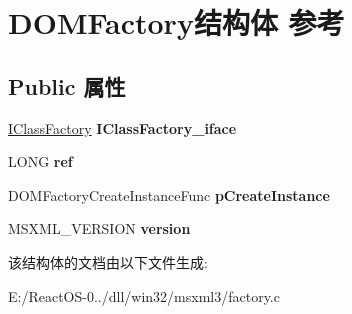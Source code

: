 \hypertarget{struct_d_o_m_factory}{}\section{D\+O\+M\+Factory结构体 参考}
\label{struct_d_o_m_factory}
\subsection*{Public 属性}
\begin{DoxyCompactItemize}
\item 
\mbox{\label{struct_d_o_m_factory_a69b45dca41afd6ee07d6d810a230c934}} 
\hyperlink{interface_i_class_factory}{I\+Class\+Factory} {\bfseries I\+Class\+Factory\+\_\+iface}
\item 
\mbox{\label{struct_d_o_m_factory_a37ee83e374e21cab804be6307da60717}} 
L\+O\+NG {\bfseries ref}
\item 
\mbox{\label{struct_d_o_m_factory_a6969b40c804732d944020ec9790976a2}} 
D\+O\+M\+Factory\+Create\+Instance\+Func {\bfseries p\+Create\+Instance}
\item 
\mbox{\label{struct_d_o_m_factory_aa57be4c36d68f2d6626fd0df201235ab}} 
M\+S\+X\+M\+L\+\_\+\+V\+E\+R\+S\+I\+ON {\bfseries version}
\end{DoxyCompactItemize}


该结构体的文档由以下文件生成\+:\begin{DoxyCompactItemize}
\item 
E\+:/\+React\+O\+S-\/0../dll/win32/msxml3/factory.\+c\end{DoxyCompactItemize}
